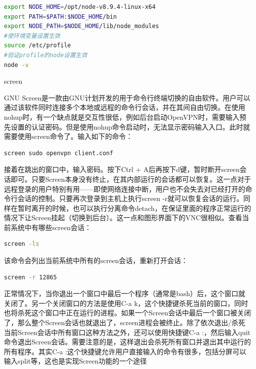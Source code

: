 \documentclass[12pt]{book}
\makeatletter
\numberwithin{dummy}{section}
\theoremstyle{ocrenumbox}
\theoremstyle{blacknumex}
\theoremstyle{blacknumbox}
\theoremstyle{ocrenum}
\renewcommand{\subsubsection}{\@startsection {subsubsection}{3}{\z@}
	{-2ex \@plus -0.1ex \@minus -.2ex}
	{.2ex \@plus.2ex }
	{\normalfont\small\sffamily\bfseries}}
\makeatother
\begin{document}
\begin{lstlisting}[language=Bash]
export NODE_HOME=/opt/node-v8.9.4-linux-x64
export PATH=$PATH:$NODE_HOME/bin
export NODE_PATH=$NODE_HOME/lib/node_modules
#使环境变量设置生效
source /etc/profile
#验证profile的node设置生效
node -v
\end{lstlisting}


\subsubsection{screen}

GNU Screen是一款由GNU计划开发的用于命令行终端切换的自由软件。用户可以通过该软件同时连接多个本地或远程的命令行会话，并在其间自由切换。在使用nohup时，有一个缺点就是交互性很低，例如后台启动OpenVPN时，需要输入预先设置的认证密码。但是使用nohup命令启动时，无法显示密码输入入口。此时就需要使用screen命令了。输入如下的命令：

\begin{lstlisting}[language=Bash]
screen sudo openvpn client.conf
\end{lstlisting}

接着在跳出的窗口中，输入密码。按下Ctrl + A后再按下d键，暂时断开screen会话即可。只要Screen本身没有终止，在其内部运行的会话都可以恢复。这一点对于远程登录的用户特别有用——即使网络连接中断，用户也不会失去对已经打开的命令行会话的控制。只要再次登录到主机上执行screen -r就可以恢复会话的运行。同样在暂时离开的时候，也可以执行分离命令detach，在保证里面的程序正常运行的情况下让Screen挂起（切换到后台）。这一点和图形界面下的VNC很相似。查看当前系统中有哪些screen会话：

\begin{lstlisting}[language=Bash]
screen -ls
\end{lstlisting}

该命令会列出当前系统中所有的screen会话，重新打开会话：

\begin{lstlisting}[language=Bash]
screen -r 12865
\end{lstlisting}

正常情况下，当你退出一个窗口中最后一个程序（通常是bash）后，这个窗口就关闭了。另一个关闭窗口的方法是使用C-a k，这个快捷键杀死当前的窗口，同时也将杀死这个窗口中正在运行的进程。如果一个Screen会话中最后一个窗口被关闭了，那么整个Screen会话也就退出了，screen进程会被终止。除了依次退出/杀死当前Screen会话中所有窗口这种方法之外，还可以使用快捷键C-a :，然后输入quit命令退出Screen会话。需要注意的是，这样退出会杀死所有窗口并退出其中运行的所有程序。其实C-a :这个快捷键允许用户直接输入的命令有很多，包括分屏可以输入split等，这也是实现Screen功能的一个途径
\end{document}
